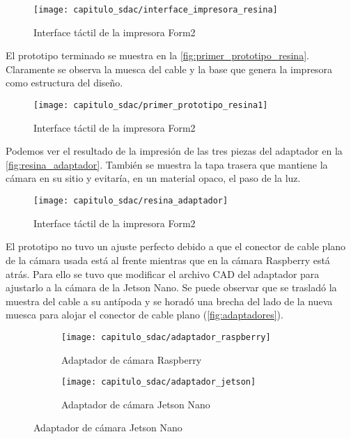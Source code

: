 \begin{figure}[H]
    \centering
    \texttt{[image: capitulo\_sdac/interface\_impresora\_resina]}
    \caption{Interface táctil de la impresora Form2}\label{fig:interface_impresora_resina}
\end{figure}


El prototipo terminado se muestra en la \autoref{fig:primer_prototipo_resina}.
Claramente se observa la muesca del cable y la base que genera la impresora como
estructura del diseño.

\begin{figure}[H]
    \centering
    \texttt{[image: capitulo\_sdac/primer\_prototipo\_resina1]}
    \caption{Interface táctil de la impresora Form2}\label{fig:primer_prototipo_resina}
\end{figure}

Podemos ver el resultado de la impresión de las tres piezas del adaptador en la
\autoref{fig:resina_adaptador}. También se muestra la tapa trasera que mantiene
la cámara en su sitio y evitaría, en un material opaco, el paso de la luz.

\begin{figure}[H]
    \centering
    \texttt{[image: capitulo\_sdac/resina\_adaptador]}
    \caption{Interface táctil de la impresora Form2}\label{fig:resina_adaptador}
\end{figure}

El prototipo no tuvo un ajuste perfecto debido a que el conector de cable plano
de la cámara usada está al frente mientras que en la cámara Raspberry está
atrás. Para ello se tuvo que modificar el archivo CAD del adaptador para
ajustarlo a la cámara de la Jetson Nano. Se puede observar que se trasladó la
muestra del cable a su antípoda y se horadó una brecha del lado de la nueva
muesca para alojar el conector de cable plano (\autoref{fig:adaptadores}).

\begin{figure}[H]
    \centering
    \begin{subfigure}{.5\textwidth}
        \centering
        \texttt{[image: capitulo\_sdac/adaptador\_raspberry]}
        \caption{Adaptador de cámara Raspberry}
    \end{subfigure}%
    \begin{subfigure}{.5\textwidth}
        \centering
        \texttt{[image: capitulo\_sdac/adaptador\_jetson]}
        \caption{Adaptador de cámara Jetson Nano}
    \end{subfigure}
    \caption{Adaptador de cámara Jetson Nano}\label{fig:adaptadores}
    \end{figure}

